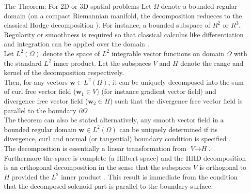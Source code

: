 The Theorem: For 2D or 3D spatial problems
Let $\Omega$ denote a bounded regular domain (on a compact Riemannian manifold, the decomposition redueces to the classical Hodge decomposition \cite{maria2003application}). For instance, a bounded subspace of $\textbf{$R^2$}$ or $\textbf{$R^3$}$. Regularity or smoothness is required so that classical calculus like differentiation and integration can be applied over the domain \cite{maria2003application,chorin1990mathematical}.\\ 
Let $\textit{$L^2$} (\Omega)$ denote the space of $\textit{$L^2$}$ integrable vector functions on domain $\Omega$ with the standard $\textit{$L^2$}$ inner product. Let the subspaces $\textit{V}$ and $\textit{H}$ denote the range and kernel of the decomposition respectively.\\
Then, for any vectors $\textbf{w} \in \textit{$L^2$} (\Omega)$, it can be uniquely decomposed \cite{chorin1990mathematical,maria2003application,brown2001accurate} into the sum of curl free vector field ($\textbf{w}_1 \in \textit{V}$) (for instance gradient vector field) and divergence free vector field ($\textbf{w}_2 \in \textit{H}$) such that the divergence free vector field is parallel to the boundary $\partial \Omega$\\
The theorem can also be stated alternatively, any smooth vector field in a bounded regular domain $\textbf{w} \in \textit{$L^2$} (\Omega)$ can be uniquely determined if its divergence, curl and normal (or tangential) boundary condition is specified \cite{maria2003application}.\\

The decomposition is essentially a linear transformation from $\textit{V} \to \textit{H}$.\\
Furthermore the space is complete (a Hilbert space) and the HHD decomposition is an orthogonal decomposition in the sense that the subspaces $\textit{V}$ is orthogonal to $\textit{H}$ provided the $\textit{L}^2$ inner product \cite{maria2003application}. This result is immediate from the condition that the decomposed solenoid part is parallel to the boundary surface.\\


